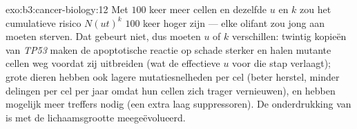\begin{solution}{exo:b3:cancer-biology:12}
Met $100$ keer meer cellen en dezelfde $u$ en $k$ zou het cumulatieve
risico $N(ut)^{k}$ $100$ keer hoger zijn --- elke olifant zou jong aan
 moeten sterven. Dat gebeurt niet, dus moeten $u$ of $k$
verschillen: twintig kopieën van \emph{TP53} maken de apoptotische
reactie op schade sterker en halen mutante cellen weg voordat zij
uitbreiden (wat de effectieve $u$ voor die stap verlaagt); grote dieren
hebben ook lagere mutatiesnelheden per cel (beter herstel, minder
delingen per cel per jaar omdat hun cellen zich trager vernieuwen), en
hebben mogelijk meer treffers nodig (een extra laag suppressoren). De
onderdrukking van  is met de lichaamsgrootte meegeëvolueerd.
\end{solution}

